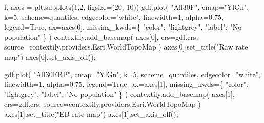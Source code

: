 \documentclass[
]{aft}
\newenvironment{Shaded}{\begin{snugshade}}{\end{snugshade}}
\newcommand{\DecValTok}[1]{\textcolor[rgb]{0.68,0.00,0.00}{#1}}
\newcommand{\FloatTok}[1]{\textcolor[rgb]{0.68,0.00,0.00}{#1}}
\newcommand{\NormalTok}[1]{\textcolor[rgb]{0.00,0.23,0.31}{#1}}
\newcommand{\OperatorTok}[1]{\textcolor[rgb]{0.37,0.37,0.37}{#1}}
\newcommand{\StringTok}[1]{\textcolor[rgb]{0.13,0.47,0.30}{#1}}
\newcommand{\VariableTok}[1]{\textcolor[rgb]{0.07,0.07,0.07}{#1}}
\begin{document}
\begin{Shaded}
\begin{Highlighting}[]
\NormalTok{f, axes }\OperatorTok{=}\NormalTok{ plt.subplots(}\DecValTok{1}\NormalTok{,}\DecValTok{2}\NormalTok{, figsize}\OperatorTok{=}\NormalTok{(}\DecValTok{20}\NormalTok{, }\DecValTok{10}\NormalTok{))}
\NormalTok{gdf.plot(}
  \StringTok{"All30P"}\NormalTok{, }
\NormalTok{  cmap}\OperatorTok{=}\StringTok{"YlGn"}\NormalTok{, }
\NormalTok{  k}\OperatorTok{=}\DecValTok{5}\NormalTok{, }
\NormalTok{  scheme}\OperatorTok{=}\StringTok{\textquotesingle{}quantiles\textquotesingle{}}\NormalTok{, }
\NormalTok{  edgecolor}\OperatorTok{=}\StringTok{"white"}\NormalTok{,}
\NormalTok{  linewidth}\OperatorTok{=}\DecValTok{1}\NormalTok{,}
\NormalTok{  alpha}\OperatorTok{=}\FloatTok{0.75}\NormalTok{, }
\NormalTok{  legend}\OperatorTok{=}\VariableTok{True}\NormalTok{, }
\NormalTok{  ax}\OperatorTok{=}\NormalTok{axes[}\DecValTok{0}\NormalTok{], }
\NormalTok{  missing\_kwds}\OperatorTok{=}\NormalTok{\{}
    \StringTok{"color"}\NormalTok{: }\StringTok{"lightgrey"}\NormalTok{,}
    \StringTok{"label"}\NormalTok{: }\StringTok{"No population"}
\NormalTok{    \}}
\NormalTok{  )}
\NormalTok{contextily.add\_basemap(}
\NormalTok{  axes[}\DecValTok{0}\NormalTok{],}
\NormalTok{  crs}\OperatorTok{=}\NormalTok{gdf.crs, }
\NormalTok{  source}\OperatorTok{=}\NormalTok{contextily.providers.Esri.WorldTopoMap}
\NormalTok{  )}
\NormalTok{axes[}\DecValTok{0}\NormalTok{].set\_title(}\StringTok{"Raw rate map"}\NormalTok{)}
\NormalTok{axes[}\DecValTok{0}\NormalTok{].set\_axis\_off()}\OperatorTok{;}

\NormalTok{gdf.plot(}
  \StringTok{"All30EBP"}\NormalTok{, }
\NormalTok{  cmap}\OperatorTok{=}\StringTok{"YlGn"}\NormalTok{, }
\NormalTok{  k}\OperatorTok{=}\DecValTok{5}\NormalTok{, }
\NormalTok{  scheme}\OperatorTok{=}\StringTok{\textquotesingle{}quantiles\textquotesingle{}}\NormalTok{, }
\NormalTok{  edgecolor}\OperatorTok{=}\StringTok{"white"}\NormalTok{,}
\NormalTok{  linewidth}\OperatorTok{=}\DecValTok{1}\NormalTok{,}
\NormalTok{  alpha}\OperatorTok{=}\FloatTok{0.75}\NormalTok{, }
\NormalTok{  legend}\OperatorTok{=}\VariableTok{True}\NormalTok{, }
\NormalTok{  ax}\OperatorTok{=}\NormalTok{axes[}\DecValTok{1}\NormalTok{], }
\NormalTok{  missing\_kwds}\OperatorTok{=}\NormalTok{\{}
    \StringTok{"color"}\NormalTok{: }\StringTok{"lightgrey"}\NormalTok{,}
    \StringTok{"label"}\NormalTok{: }\StringTok{"No population"}
\NormalTok{    \}}
\NormalTok{  )}
\NormalTok{contextily.add\_basemap(}
\NormalTok{  axes[}\DecValTok{1}\NormalTok{],}
\NormalTok{  crs}\OperatorTok{=}\NormalTok{gdf.crs, }
\NormalTok{  source}\OperatorTok{=}\NormalTok{contextily.providers.Esri.WorldTopoMap}
\NormalTok{  )}
\NormalTok{axes[}\DecValTok{1}\NormalTok{].set\_title(}\StringTok{"EB rate map"}\NormalTok{)}
\NormalTok{axes[}\DecValTok{1}\NormalTok{].set\_axis\_off()}\OperatorTok{;}
\end{Highlighting}
\end{Shaded}
\end{document}

